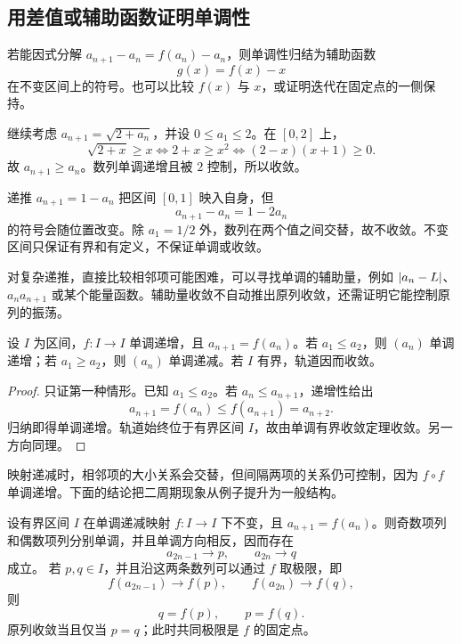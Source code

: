 \subsection{用差值或辅助函数证明单调性}


若能因式分解 \(a_{n+1}-a_n=f(a_n)-a_n\)，则单调性归结为辅助函数
\[
 g(x)=f(x)-x
\]
在不变区间上的符号。也可以比较 \(f(x)\) 与 \(x\)，或证明迭代在固定点的一侧保持。

\begin{example}
继续考虑 \(a_{n+1}=\sqrt{2+a_n}\)，并设 \(0\le a_1\le2\)。在 \([0,2]\) 上，
\[
 \sqrt{2+x}\ge x
 \Longleftrightarrow 2+x\ge x^2
 \Longleftrightarrow (2-x)(x+1)\ge0.
\]
故 \(a_{n+1}\ge a_n\)。数列单调递增且被 \(2\) 控制，所以收敛。
\end{example}

\begin{example}[差值符号不固定]
递推 \(a_{n+1}=1-a_n\) 把区间 \([0,1]\) 映入自身，但
\[
 a_{n+1}-a_n=1-2a_n
\]
的符号会随位置改变。除 \(a_1=1/2\) 外，数列在两个值之间交替，故不收敛。不变区间只保证有界和有定义，不保证单调或收敛。
\end{example}

对复杂递推，直接比较相邻项可能困难，可以寻找单调的辅助量，例如 \(\left|a_n-L\right|\)、\(a_na_{n+1}\) 或某个能量函数。辅助量收敛不自动推出原列收敛，还需证明它能控制原列的振荡。

\begin{proposition}[递增映射的轨道]
设 \(I\) 为区间，\(f:I\to I\) 单调递增，且 \(a_{n+1}=f(a_n)\)。若
\(a_1\le a_2\)，则 \((a_n)\) 单调递增；若 \(a_1\ge a_2\)，则
\((a_n)\) 单调递减。若 \(I\) 有界，轨道因而收敛。
\end{proposition}

\begin{proof}
只证第一种情形。已知 \(a_1\le a_2\)。若 \(a_n\le a_{n+1}\)，递增性给出
\[
 a_{n+1}=f(a_n)\le f(a_{n+1})=a_{n+2}.
\]
归纳即得单调递增。轨道始终位于有界区间 \(I\)，故由单调有界收敛定理收敛。另一方向同理。
\end{proof}

映射递减时，相邻项的大小关系会交替，但间隔两项的关系仍可控制，因为
\(f\circ f\) 单调递增。下面的结论把二周期现象从例子提升为一般结构。

\begin{proposition}[递减映射与奇偶项列]
设有界区间 \(I\) 在单调递减映射 \(f:I\to I\) 下不变，且
\(a_{n+1}=f(a_n)\)。则奇数项列和偶数项列分别单调，并且单调方向相反，因而存在
\[
 a_{2n-1}\to p,\qquad a_{2n}\to q
\]
成立。
若 \(p,q\in I\)，并且沿这两条数列可以通过 \(f\) 取极限，即
\[
 f(a_{2n-1})\to f(p),\qquad f(a_{2n})\to f(q),
\]
则
\[
 q=f(p),\qquad p=f(q).
\]
原列收敛当且仅当 \(p=q\)；此时共同极限是 \(f\) 的固定点。
\end{proposition}

